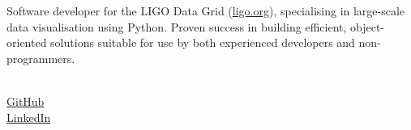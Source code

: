 \begin{minipage}[b]{.7\textwidth}
    Software developer for the LIGO Data Grid (\href{http://www.ligo.org}{ligo.org}), specialising in large-scale data visualisation using Python.
    Proven success in building efficient, object-oriented solutions suitable for use by both experienced developers and non-programmers.
\end{minipage}
\hspace{.02\textwidth}
{\color{gray} \vrule{}}
\hspace{.02\textwidth}
\begin{minipage}[b]{.2\textwidth}
    \vspace{.1cm}\\
    \href{https://github.com/duncanmmacleod}{GitHub}\\
    \href{https://www.linkedin.com/in/duncanmmacleod}{LinkedIn}\\
\end{minipage}
